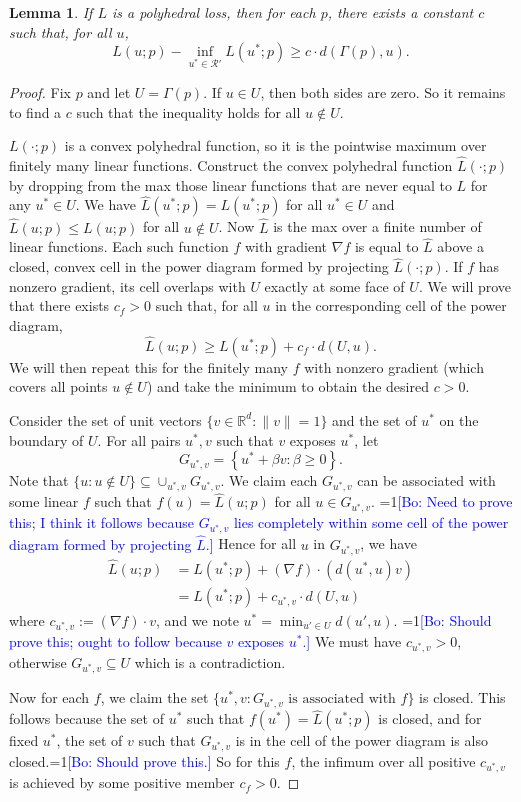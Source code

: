 \documentclass[12pt]{article}
\newcommand{\Comments}{1}
\newcommand{\mynote}[2]{\ifnum\Comments=1\textcolor{#1}{#2}\fi}
\newcommand{\bo}[1]{\mynote{blue}{[Bo: #1]}}
\newcommand{\reals}{\mathbb{R}}
\newcommand{\R}{\mathcal{R}}
\newtheorem{lemma}{Lemma}
\begin{document}
\begin{lemma} \label{lemma:distance-loss}
  If $L$ is a polyhedral loss, then for each $p$, there exists a constant $c$ such that, for all $u$,
    \[ L(u;p) - \inf_{u^* \in \R'} L(u^*;p) \geq c \cdot d(\Gamma(p),u) . \]
\end{lemma}
\begin{proof}
  Fix $p$ and let $U = \Gamma(p)$.
  If $u \in U$, then both sides are zero.
  So it remains to find a $c$ such that the inequality holds for all $u \not\in U$.

  $L(\cdot;p)$ is a convex polyhedral function, so it is the pointwise maximum over finitely many linear functions.
  Construct the convex polyhedral function $\hat{L}(\cdot;p)$ by dropping from the max those linear functions that are never equal to $L$ for any $u^* \in U$.
  We have $\hat{L}(u^*;p) = L(u^*;p)$ for all $u^* \in U$ and $\hat{L}(u;p) \leq L(u;p)$ for all $u \not\in U$.
  Now $\hat{L}$ is the max over a finite number of linear functions.
  Each such function $f$ with gradient $\nabla f$ is equal to $\hat{L}$ above a closed, convex cell in the power diagram formed by projecting $\hat{L}(\cdot;p)$.
  If $f$ has nonzero gradient, its cell overlaps with $U$ exactly at some face of $U$.
  We will prove that there exists $c_f > 0$ such that, for all $u$ in the corresponding cell of the power diagram,
    \[ \hat{L}(u;p) \geq L(u^*;p) + c_f \cdot d(U,u) . \]
  We will then repeat this for the finitely many $f$ with nonzero gradient (which covers all points $u \not\in U$) and take the minimum to obtain the desired $c > 0$.

  Consider the set of unit vectors $\{v \in \reals^d : \|v\|=1\}$ and the set of $u^*$ on the boundary of $U$.
  For all pairs $u^*,v$ such that $v$ exposes $u^*$, let
    \[ G_{u^*,v} = \left\{ u^* + \beta v : \beta \geq 0 \right\} . \]
  Note that $\{ u : u \not\in U\} \subseteq \cup_{u^*,v} G_{u^*,v}$.
  We claim each $G_{u^*,v}$ can be associated with some linear $f$ such that $f(u) = \hat{L}(u;p)$ for all $u \in G_{u^*,v}$.
  \bo{Need to prove this; I think it follows because $G_{u^*,v}$ lies completely within some cell of the power diagram formed by projecting $\hat{L}$.}
  Hence for all $u$ in $G_{u^*,v}$, we have
  \begin{align*}
    \hat{L}(u;p) &= \hat{L}(u^*;p) + (\nabla f) \cdot (d(u^*,u) v)  \\
                      &= L(u^*;p) + c_{u^*,v} \cdot d(U,u)
  \end{align*}
  where $c_{u^*,v} := (\nabla f) \cdot v$, and we note $u^* = \min_{u' \in U} d(u',u)$. \bo{Should prove this; ought to follow because $v$ exposes $u^*$.}
  We must have $c_{u^*,v} > 0$, otherwise $G_{u^*,v} \subseteq U$ which is a contradiction.
  
  Now for each $f$, we claim the set $\{u^*, v : \text{$G_{u^*,v}$ is associated with $f$}\}$ is closed.
  This follows because the set of $u^*$ such that $f(u^*) = \hat{L}(u^*;p)$ is closed, and for fixed $u^*$, the set of $v$ such that $G_{u^*,v}$ is in the cell of the power diagram is also closed.\bo{Should prove this.}
  So for this $f$, the infimum over all positive $c_{u^*,v}$ is achieved by some positive member $c_f > 0$.
\end{proof}
\end{document}
